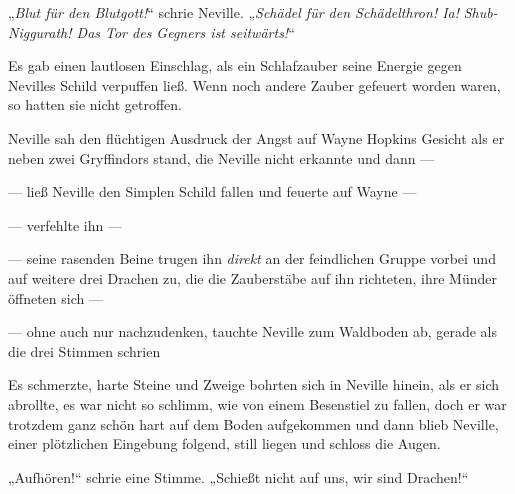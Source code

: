 „\emph{Blut für den Blutgott!}“ schrie Neville.
„\emph{Schädel für den Schädelthron! Ia!} \emph{Shub-Niggurath! Das Tor des Gegners ist seitwärts!}“

Es gab einen lautlosen Einschlag, als ein Schlafzauber seine Energie gegen Nevilles Schild verpuffen ließ. Wenn noch andere Zauber gefeuert worden waren, so hatten sie nicht getroffen.

Neville sah den flüchtigen Ausdruck der Angst auf Wayne Hopkins Gesicht als er neben zwei Gryffindors stand, die Neville nicht erkannte und dann —

— ließ Neville den Simplen Schild fallen und feuerte auf Wayne —

— verfehlte ihn —

— seine rasenden Beine trugen ihn \emph{direkt} an der feindlichen Gruppe vorbei und auf weitere drei Drachen zu, die die Zauberstäbe auf ihn richteten, ihre Münder öffneten sich —

— ohne auch nur nachzudenken, tauchte Neville zum Waldboden ab, gerade als die drei Stimmen schrien 

Es schmerzte, harte Steine und Zweige bohrten sich in Neville hinein, als er sich abrollte, es war nicht so schlimm, wie von einem Besenstiel zu fallen, doch er war trotzdem ganz schön hart auf dem Boden aufgekommen und dann blieb Neville, einer plötzlichen Eingebung folgend, still liegen und schloss die Augen.

„Aufhören!“ schrie eine Stimme.
„Schießt nicht auf uns, wir sind Drachen!“

